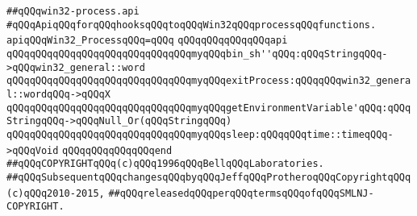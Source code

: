 \label{src/lib/std/src/win32/win32-process.api}
\verb|##qQQqwin32-process.api|\newline
\newline
\newline
\newline
\newline
\verb|#qQQqApiqQQqforqQQqhooksqQQqtoqQQqWin32qQQqprocessqQQqfunctions.|\newline
\newline
\newline
\newline
\verb|apiqQQqWin32_ProcessqQQq=qQQq|\newline
\verb|qQQqqQQqqQQqqQQqapi|\newline
\verb|qQQqqQQqqQQqqQQqqQQqqQQqqQQqqQQqmyqQQqbin_sh''qQQq:qQQqStringqQQq->qQQqwin32_general::word|\newline
\verb|qQQqqQQqqQQqqQQqqQQqqQQqqQQqqQQqmyqQQqexitProcess:qQQqqQQqwin32_general::wordqQQq->qQQqX|\newline
\verb|qQQqqQQqqQQqqQQqqQQqqQQqqQQqqQQqmyqQQqgetEnvironmentVariable'qQQq:qQQqStringqQQq->qQQqNull_Or(qQQqStringqQQq)|\newline
\verb|qQQqqQQqqQQqqQQqqQQqqQQqqQQqqQQqmyqQQqsleep:qQQqqQQqtime::timeqQQq->qQQqVoid|\newline
\verb|qQQqqQQqqQQqqQQqend|\newline
\newline
\newline
\verb|##qQQqCOPYRIGHTqQQq(c)qQQq1996qQQqBellqQQqLaboratories.|\newline
\verb|##qQQqSubsequentqQQqchangesqQQqbyqQQqJeffqQQqProtheroqQQqCopyrightqQQq(c)qQQq2010-2015,|\newline
\verb|##qQQqreleasedqQQqperqQQqtermsqQQqofqQQqSMLNJ-COPYRIGHT.|\newline


